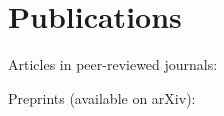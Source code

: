 \chapter*{Publications}

\noindent
Articles in peer-reviewed journals:
\begin{refsection}[ownpubs]
  \small%
  \nocite{*}
  \printbibliography[heading=none,type=article]
\end{refsection}


\noindent
Preprints (available on arXiv):
\begin{refsection}[preprints]
  \small%
  \nocite{*}
  \printbibliography[heading=none,type=misc]
\end{refsection}

